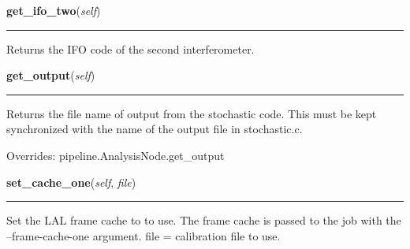     \begin{boxedminipage}{\textwidth}

    \raggedright \textbf{get\_ifo\_two}(\textit{self})

    \vspace{-1.5ex}

    \rule{\textwidth}{0.5\fboxrule}
    Returns the IFO code of the second interferometer.

    \vspace{1ex}

    \end{boxedminipage}

    \label{stochastic:StochasticNode:get_output}
    \vspace{0.5ex}

    \begin{boxedminipage}{\textwidth}

    \raggedright \textbf{get\_output}(\textit{self})

    \vspace{-1.5ex}

    \rule{\textwidth}{0.5\fboxrule}
    Returns the file name of output from the stochastic code. This must 
    be kept synchronized with the name of the output file in 
    stochastic.c.

    \vspace{1ex}

      Overrides: pipeline.AnalysisNode.get\_output

    \end{boxedminipage}

    \label{stochastic:StochasticNode:set_cache_one}
    \vspace{0.5ex}

    \begin{boxedminipage}{\textwidth}

    \raggedright \textbf{set\_cache\_one}(\textit{self}, \textit{file})

    \vspace{-1.5ex}

    \rule{\textwidth}{0.5\fboxrule}
    Set the LAL frame cache to to use. The frame cache is passed to the 
    job with the --frame-cache-one argument. file = calibration file to 
    use.

    \vspace{1ex}

    \end{boxedminipage}

